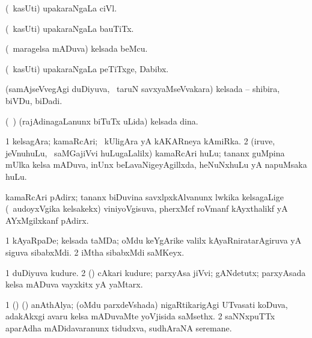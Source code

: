 {{{{{{\begin{center}
\bentry
{} 
\gl{\nA}
\expl{}
\bmng
(\kanmu\ kasUti) upakaraNgaLa ciVl. 
\emng
\eentry

\bentry 
{} 
\gl{\nA}
\expl{}
\bmng
(\kanmu\ kasUti) upakaraNgaLa bauTiTx. 
\emng
\eentry

\bentry
{} 
\gl{\nA}
\expl{}
\bmng
(\kanmu\ maragelsa mADuva) kelsada beMcu. 
\emng
\eentry

\bentry
{} 
\gl{\nA}
\expl{}
\bmng
(\kanmu\ kasUti) upakaraNgaLa peTiTxge, Dabibx. 
\emng
\eentry

\bentry
{} 
\gl{\nA}
\expl{}
\bmng
(samAjseVvegAgi duDiyuva, \kanmu\ taruN savxyaMseVvakara) kelsada -- shibira, biVDu, biDadi. 
\emng
\eentry

\bentry
{} 
\gl{\nA}
\expl{}
\bmng
(\kanmu\ \ame) (rajAdinagaLanunx biTuTx uLida) kelsada dina. 
\emng
\eentry

\bentry
{} 
\gl{\nA}
\expl{}
\bmng
\bnum
\num{1} kelsagAra; kamaRcAri; \kanmu\ kUligAra yA kAKARneya kAmiRka. 
\num{2} (iruve, jeVnuhuLu, \mo\ saMGajiVvi huLugaLalilx) kamaRcAri huLu; tananx guMpina mUlka kelsa mADuva, inUnx beLavaNigeyAgillxda, heNuNxhuLu yA napuMsaka huLu. 
\enum
\emng
\eentry

\bentry 
{} 
\gl{\nA}
\expl{}
\bmng
kamaRcAri pAdirx; tananx biDuvina savxlpxkAlvanunx lwkika kelsagaLige (\kanmu\ audoyxVgika kelsakekx) viniyoVgisuva, pherxMcf roVmanf kAyxthalikf yA AYxMgilxkanf pAdirx. 
\emng
\eentry

\bentry
{} 
\gl{\nA}
\expl{}
\bmng
\bnum
\num{1} kAyaRpaDe; kelsada taMDa; oMdu keYgArike \mo valilx kAyaRniratarAgiruva yA siguva sibabxMdi. 
\num{2} iMtha sibabxMdi saMKeyx. 
\enum
\emng
\eentry

\bentry
{} 
\gl{\nA}
\expl{}
\bmng
\bnum
\num{1} duDiyuva kudure. 
\num{2} (\rUpa) cAkari kudure; parxyAsa jiVvi; gANdetutx; parxyAsada kelsa mADuva vayxkitx yA yaMtarx. 
\enum
\emng
\eentry

\bentry
{} 
\gl{\nA}
\expl{}
\bmng
% 
\bnum
\num{1} (\birx) (\ca) anAthAlya; (oMdu parxdeVshada) nigaRtikarigAgi UTvasati koDuva, adakAkxgi avaru kelsa mADuvaMte yoVjisida saMsethx. 
\num{2} saNNxpuTTx aparAdha mADidavaranunx tidudxva, sudhAraNA seremane. 
\enum
\emng
\eentry


\end{center}}}}}}}
